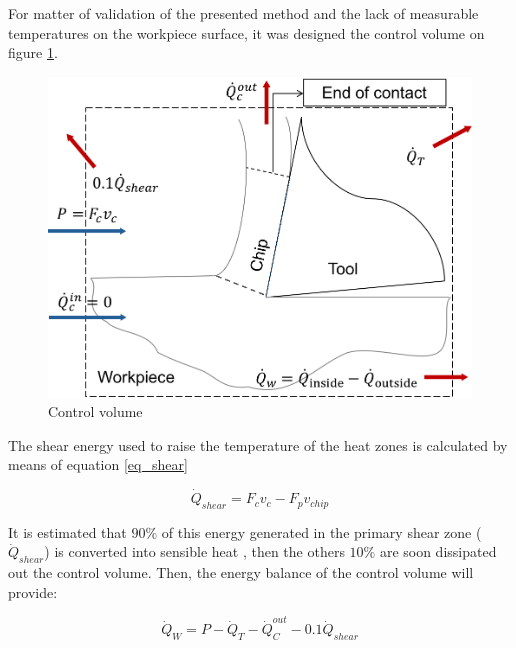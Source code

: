 	For matter of validation of the presented method and the lack of measurable temperatures on the workpiece surface, it was designed the control volume on figure \ref{fig:volControl}.

	\begin{figure}[H]
		\centering
		\captionsetup{justification=centering}
		\includegraphics[scale=0.6]{Imagens/volumeControl.png}
		\caption{Control volume}
		\label{fig:volControl}
	\end{figure}

	The shear energy used to raise the temperature of the heat zones is calculated by means of equation \ref{eq_shear}

	\begin{equation} 
	\label{eq_shear}
	\dot{Q}_{shear} = F_{c}v_{c} - F_{p}v_{chip}
	\end{equation}

	It is estimated that $90\%$ of this energy generated in the primary shear zone ($\dot{Q}_{shear}$) is converted into sensible heat \cite{trigger1942}, then the others $10\%$ are soon dissipated out the control volume. Then, the energy balance of the control volume will provide:

	\begin{equation} 
	\label{eq_energybalance}
	\dot{Q}_{W} = P - \dot{Q}_{T} - \dot{Q}_{C}^{out} - 0.1\dot{Q}_{shear}
	\end{equation}
